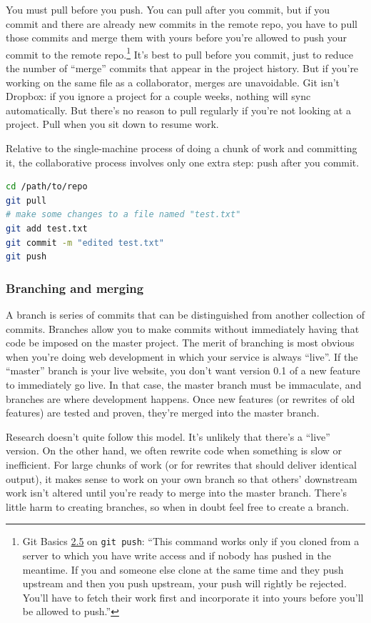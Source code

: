 You must pull before you push.
You can pull after you commit, but if you commit and there are already new commits in the remote repo, you have to pull those commits and merge them with yours before you're allowed to push your commit to the remote repo.\footnote{
	Git Basics \href{https://git-scm.com/book/en/v2/Git-Basics-Working-with-Remotes\#_pushing_remotes}{2.5} on \texttt{git push}: ``This command works only if you cloned from a server to which you have write access and if nobody has pushed in the meantime. If you and someone else clone at the same time and they push upstream and then you push upstream, your push will rightly be rejected. You'll have to fetch their work first and incorporate it into yours before you'll be allowed to push.''
}
It's best to pull before you commit, just to reduce the number of ``merge'' commits that appear in the project history.
But if you're working on the same file as a collaborator, merges are unavoidable. 
Git isn't Dropbox: if you ignore a project for a couple weeks, nothing will sync automatically.
But there's no reason to pull regularly if you're not looking at a project.
Pull when you sit down to resume work.

Relative to the single-machine process of doing a chunk of work and committing it,
the collaborative process involves only one extra step: 
push after you commit.
\begin{lstlisting}[language=bash]
cd /path/to/repo 
git pull
# make some changes to a file named "test.txt"
git add test.txt
git commit -m "edited test.txt"
git push
\end{lstlisting}


\subsubsection{Branching and merging}
A branch is series of commits that can be distinguished from another collection of commits.
Branches allow you to make commits without immediately having that code be imposed on the master project.
The merit of branching is most obvious when you're doing web development in which your service is always ``live''.
If the ``master'' branch is your live website, you don't want version 0.1 of a new feature to immediately go live.
In that case, the master branch must be immaculate, and branches are where development happens.
Once new features (or rewrites of old features) are tested and proven, they're merged into the master branch. 

Research doesn't quite follow this model.
It's unlikely that there's a ``live'' version.
On the other hand, we often rewrite code when something is slow or inefficient.
For large chunks of work (or for rewrites that should deliver identical output), it makes sense to work on your own branch so that others' downstream work isn't altered until you're ready to merge into the master branch.
There's little harm to creating branches, so when in doubt feel free to create a branch.

